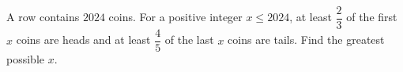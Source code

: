 A row contains $2024$ coins. For a positive integer $x\le2024$, at least $\dfrac{2}{3}$ of the first $x$ coins are heads and at least $\dfrac{4}{5}$ of the last $x$ coins are tails. Find the greatest possible $x$.
